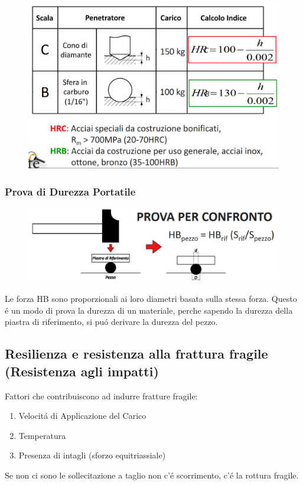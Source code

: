 \documentclass{article}
\begin{document}
{\begin{figure}[!h]
                    \end{figure}
                    \begin{figure}[!h]
                        \centering
                        \includegraphics[width=.85\linewidth]{Tabella per le Prova di Rockwell.png}
                    \end{figure}
                \newpage
                \subsubsection{Prova di Durezza Portatile}
                    \begin{figure}[!h]
                        \centering
                        \includegraphics[width=.85\linewidth]{Diagramma di Prova di Durezza Portatile.png}
                    \end{figure}
                    Le forza HB sono proporzionali ai loro diametri basata sulla stessa forza. Questo \'e un modo di prova la durezza di un materiale, perche sapendo la durezza della piastra di riferimento, si pu\'o derivare la durezza del pezzo.
            \subsection{Resilienza e resistenza alla frattura fragile (Resistenza agli impatti)}
                Fattori che contribuiscono ad indurre fratture fragile:
                \begin{enumerate}
                    \item Velocit\'a di Applicazione del Carico
                    \item Temperatura
                    \item Presenza di intagli (sforzo equitriassiale)
                \end{enumerate}
                Se non ci sono le sollecitazione a taglio non c'\'e scorrimento, c'\'e la rottura fragile.
}
\end{document}
